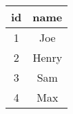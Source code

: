 \begin{tabular}{|c|c|}
    \hline
        \textbf{id} & \textbf{name} \\ \hline
        1 & Joe \\ 
        2 & Henry \\ 
        3 & Sam \\ 
        4 & Max \\ \hline
\end{tabular}
